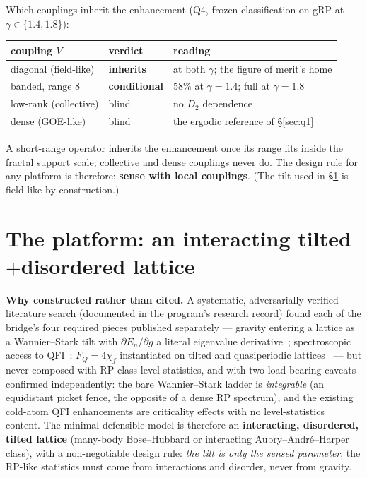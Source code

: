 \documentclass[11pt]{article}
\newcommand{\chif}{\chi_{f}}
\begin{document}
Which couplings inherit the enhancement (Q4, frozen classification on gRP at
$\gamma \in \{1.4, 1.8\}$):

\begin{center}
\begin{tabular}{lll}
\toprule
coupling $V$ & verdict & reading\\
\midrule
diagonal (field-like) & \textbf{inherits} & at both $\gamma$; the figure of merit's home\\
banded, range 8 & \textbf{conditional} & $58\%$ at $\gamma=1.4$; full at $\gamma=1.8$\\
low-rank (collective) & blind & no $D_2$ dependence\\
dense (GOE-like) & blind & the ergodic reference of \S\ref{sec:q1}\\
\bottomrule
\end{tabular}
\end{center}

A short-range operator inherits the enhancement once its range fits inside the fractal support
scale; collective and dense couplings never do. The design rule for any platform is therefore:
\textbf{sense with local couplings}. (The tilt used in \S\ref{sec:platform} is field-like by
construction.)

\section{The platform: an interacting tilted$+$disordered lattice}
\label{sec:platform}

\textbf{Why constructed rather than cited.} A systematic, adversarially verified literature search
(documented in the program's research record) found each of the bridge's four required pieces
published separately --- gravity entering a lattice as a
Wannier--Stark tilt with $\partial E_n/\partial g$ a literal eigenvalue
derivative~\cite{zapata2001,wilkinson1996}; spectroscopic access to QFI~\cite{hauke2016};
$F_Q = 4\chif$ instantiated on tilted and quasiperiodic lattices~\cite{sahoo2024,sahoo2024b} ---
but never composed with RP-class level statistics, and with two load-bearing caveats confirmed
independently: the bare Wannier--Stark ladder is \emph{integrable} (an equidistant picket fence,
the opposite of a dense RP spectrum), and the existing cold-atom QFI enhancements are
criticality effects with no level-statistics content. The minimal defensible model is therefore an
\textbf{interacting, disordered, tilted lattice} (many-body Bose--Hubbard or interacting
Aubry--Andr\'e--Harper class), with a non-negotiable design rule: \emph{the tilt is only the sensed
parameter}; the RP-like statistics must come from interactions and disorder, never from gravity.
\end{document}
